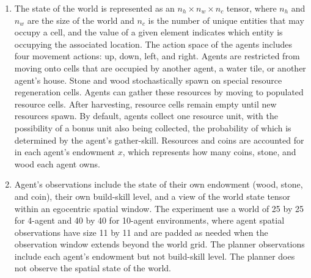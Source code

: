 \documentclass{article}
\begin{document}
\begin{enumerate}
	\item The state of the world is represented as an \( n_{h} \times n_{w} \times n_{c} \) tensor, where \( n_{h} \) and \( n_{w} \) are the size of the world and \( n_{c} \) is the number of unique entities that may occupy a cell, and the value of a given element indicates which entity is occupying the associated location. The action space of the agents includes four movement actions: up, down, left, and right. Agents are restricted from moving onto cells that are occupied by another agent, a water tile, or another agent’s house. Stone and wood stochastically spawn on special resource regeneration cells. Agents can gather these resources by moving to populated resource cells. After harvesting, resource cells remain empty until new resources spawn. By default, agents collect one resource unit, with the possibility of a bonus unit also being collected, the probability of which is determined by the agent’s gather-skill. Resources and coins are accounted for in each agent’s endowment \( x \), which represents how many coins, stone, and wood each agent owns.
	
	\item Agent's observations include the state of their own endowment (wood, stone, and coin), their own build-skill level, and a view of the world state tensor within an egocentric spatial window. The experiment use a world of 25 by 25 for 4-agent and 40 by 40 for 10-agent environments, where agent spatial observations have size 11 by 11 and are padded as needed when the observation window extends beyond the world grid. The planner observations include each agent’s endowment but not build-skill level. The planner does not observe the spatial state of the world.
	

\end{enumerate}
\end{document}

